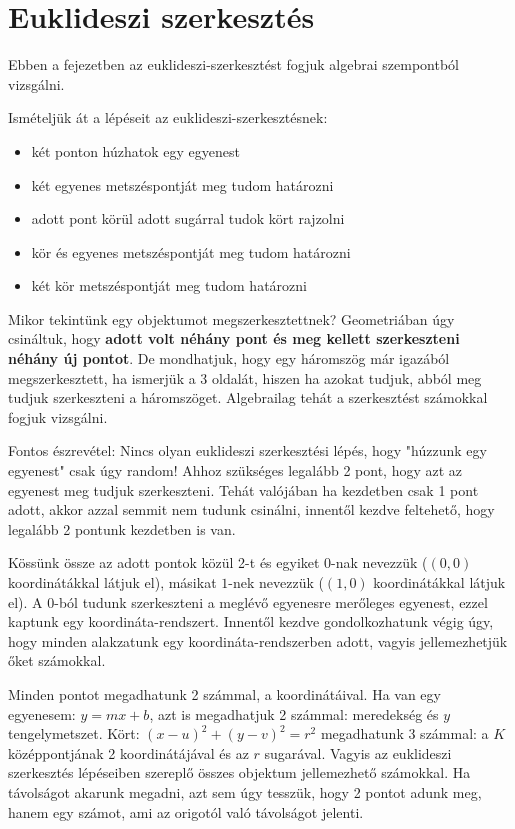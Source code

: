 \documentclass[12pt]{book}
\theoremstyle{plain} %
\theoremstyle{definition} %
\theoremstyle{remark}
\numberwithin{equation}{section}  %
\begin{document}
	\section{Euklideszi szerkesztés}
	Ebben a fejezetben az euklideszi-szerkesztést fogjuk algebrai szempontból vizsgálni.
	
	Ismételjük át a lépéseit az euklideszi-szerkesztésnek:
	\begin{itemize}
		\item két ponton húzhatok egy egyenest
		\item két egyenes metszéspontját meg tudom határozni
		\item adott pont körül adott sugárral tudok kört rajzolni
		\item kör és egyenes metszéspontját meg tudom határozni
		\item két kör metszéspontját meg tudom határozni
	\end{itemize}

	Mikor tekintünk egy objektumot megszerkesztettnek? Geometriában úgy csináltuk, hogy \textbf{adott volt néhány pont és meg kellett szerkeszteni néhány új pontot}. De mondhatjuk, hogy egy háromszög már igazából megszerkesztett, ha ismerjük a 3 oldalát, hiszen ha azokat tudjuk, abból meg tudjuk szerkeszteni a háromszöget. Algebrailag tehát a szerkesztést számokkal fogjuk vizsgálni.
	
	Fontos észrevétel: Nincs olyan euklideszi szerkesztési lépés, hogy "húzzunk egy egyenest" csak úgy random! Ahhoz szükséges legalább 2 pont, hogy azt az egyenest meg tudjuk szerkeszteni. Tehát valójában ha kezdetben csak 1 pont adott, akkor azzal semmit nem tudunk csinálni, innentől kezdve feltehető, hogy legalább 2 pontunk kezdetben is van.
	
	Kössünk össze az adott pontok közül 2-t és egyiket $0$-nak nevezzük ($(0,0)$ koordinátákkal látjuk el), másikat $1$-nek nevezzük ($(1,0)$ koordinátákkal látjuk el). A $0$-ból tudunk szerkeszteni a meglévő egyenesre merőleges egyenest, ezzel kaptunk egy koordináta-rendszert. Innentől kezdve gondolkozhatunk végig úgy, hogy minden alakzatunk egy koordináta-rendszerben adott, vagyis jellemezhetjük őket számokkal.
	
	Minden pontot megadhatunk 2 számmal, a koordinátáival. Ha van egy egyenesem: $y=mx+b$, azt is megadhatjuk 2 számmal: meredekség és $y$ tengelymetszet. Kört: $(x-u)^2+(y-v)^2=r^2$ megadhatunk 3 számmal: a $K$ középpontjának 2 koordinátájával és az $r$ sugarával. Vagyis az euklideszi szerkesztés lépéseiben szereplő összes objektum jellemezhető számokkal. Ha távolságot akarunk megadni, azt sem úgy tesszük, hogy 2 pontot adunk meg, hanem egy számot, ami az origotól való távolságot jelenti.
	
\end{document}
